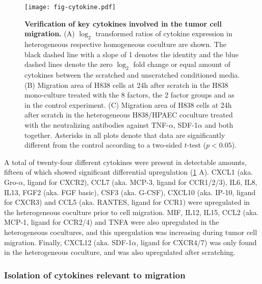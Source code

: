 \begin{figure}
\begin{center}
\texttt{[image: fig-cytokine.pdf]}
\end{center}
\caption[Verification of key cytokines]{
{\bf Verification of key cytokines involved in the tumor cell migration.} 
(A) $\log_2$ transformed ratios of cytokine expression in heterogeneous respective
homogeneous coculture are shown. The black dashed line with a slope of 1 denotes 
the identity and the blue dashed lines denote the zero $\log_2$ fold change
or equal amount of cytokines between the scratched and unscratched conditioned 
media.
(B) Migration area of H838 cells at 24h after scratch in the H838 mono-culture 
treated with the 8
factors, the 2 factor groups and as in the control experiment.
(C) Migration area of H838 cells at 24h after scratch in the heterogeneous 
H838/HPAEC coculture 
treated with the neutralizing antibodies against TNF-$\alpha$, SDF-1$\alpha$
and both together. Asterisks in all plots denote that data are significantly 
different from the control according to a two-sided $t$-test ($p < 0.05$).
}
\label{fig:cytokine}
\end{figure}

A total of twenty-four different cytokines were present in detectable amounts,
fifteen of which showed significant differential upregulation
(\ref{fig:cytokine} A).
CXCL1 (aka. Gro-$\alpha$, ligand for CXCR2), CCL7 (aka. MCP-3, ligand for CCR1/2/3), IL6, IL8, IL13, FGF2 (aka. FGF basic), CSF3 (aka. G-CSF), CXCL10 (aka. IP-10, ligand for CXCR3) and CCL5 (aka. RANTES, ligand for CCR1) were
upregulated in the heterogeneous coculture prior to cell migration.
MIF, IL12, IL15, CCL2 (aka. MCP-1, ligand for CCR2/4) and TNFA were also upregulated
in the heterogeneous cocultures, and this upregulation was increasing
during tumor cell migration.
Finally, CXCL12 (aka. SDF-1$\alpha$, ligand for CXCR4/7) was only found in the heterogeneous coculture,
and was also upregulated after scratching. 

\subsubsection{Isolation of cytokines relevant to migration}

